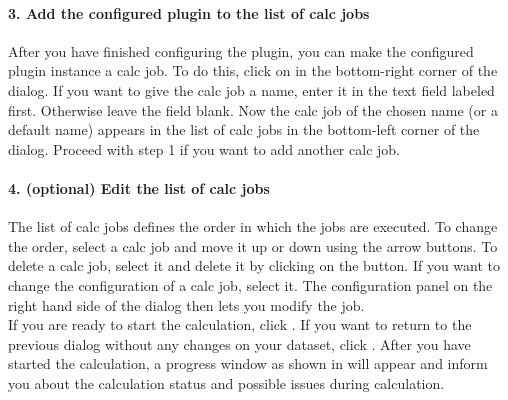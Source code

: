 \paragraph{3. Add the configured plugin to the list of calc jobs}
  After you have finished configuring the plugin, you can make the configured plugin instance a calc job.
  To do this, click on  in the bottom-right corner of the dialog.
  If you want to give the calc job a name, enter it in the text field labeled  first. Otherwise leave the field blank.
  Now the calc job of the chosen name (or a default name) appears in the list of calc jobs in the bottom-left corner of the dialog.
  Proceed with step 1 if you want to add another calc job.

\paragraph{4. (optional) Edit the list of calc jobs}
  The list of calc jobs defines the order in which the jobs are executed.
  To change the order, select a calc job and move it up or down using the arrow buttons.
  To delete a calc job, select it and delete it by clicking on the  button.
  If you want to change the configuration of a calc job, select it.
  The configuration panel on the right hand side of the dialog then lets you modify the job.\\

If you are ready to start the calculation, click .
If you want to return to the previous dialog without any changes on your dataset, click .
After you have started the calculation, a progress window as shown in 
will appear and inform you about the calculation status and possible issues during calculation.

